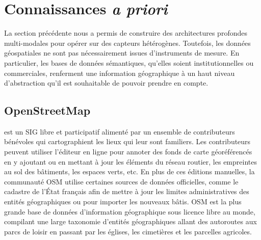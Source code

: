 

\section{Connaissances \textit{a priori}}

La section précédente nous a permis de construire des architectures profondes multi-modales pour opérer sur des capteurs hétérogènes. Toutefois, les données géospatiales ne sont pas nécessairement issues d'instruments de mesure. En particulier, les bases de données sémantiques, qu'elles soient institutionnelles ou commerciales, renferment une information géographique à un haut niveau d'abstraction qu'il est souhaitable de pouvoir prendre en compte.

\subsection{OpenStreetMap}

 est un \gls{SIG} libre et participatif alimenté par un ensemble de contributeurs bénévoles qui cartographient les lieux qui leur sont familiers. Les contributeurs peuvent utiliser l'éditeur en ligne pour annoter des fonds de carte géoréférencés en y ajoutant ou en mettant à jour les éléments du réseau routier, les empreintes au sol des bâtiments, les espaces verts, etc. En plus de ces éditions manuelles, la communauté \gls{OSM} utilise certaines sources de données officielles, comme le cadastre de l'État français afin de mettre à jour les limites administratives des entités géographiques ou pour importer les nouveaux bâtis. \gls{OSM} est la plus grande base de données d'information géographique sous licence libre au monde, compilant une large taxonomie d'entités géographiques allant des autoroutes aux parcs de loisir en passant par les églises, les cimetières et les parcelles agricoles.

